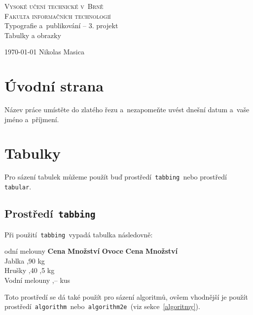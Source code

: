 \documentclass[a4paper, 11pt]{article}
\begin{document}
\begin{titlepage}
		\begin{center}
			{\Huge\textsc{Vysoké učení technické v~Brně}}\\
			\huge\textsc{Fakulta informačních technologií} \\
			{\LARGE Typografie a~publikování -- 3. projekt}\\
			\Huge{Tabulky a obrazky
			}
		\end{center}

		{\Large
			\today
			\hfill
			Nikolas Masica
		}
	\end{titlepage}


\section{Úvodní strana}
Název práce umístěte do zlatého řezu a~nezapomeňte uvést dnešní datum a~vaše jméno a~příjmení.
\section{Tabulky}
Pro sázení tabulek můžeme použít buď prostředí\texttt{ tabbing }nebo prostředí\texttt{ tabular}.
\subsection{Prostředí\texttt{ tabbing}}
Při použití\texttt{ tabbing }vypadá tabulka následovně:
\begin{tabbing}
odní melouny    \quad	\= \textbf{Cena} \quad	\= \textbf{Množství}	\kill
\textbf{Ovoce}		\> \textbf{Cena}		\> \textbf{Množství}	\\
Jablka				,90				 kg					\\
Hrušky				,40				,5 kg				\\
Vodní melouny		,--				 kus				\\
\end{tabbing}
Toto prostředí se dá také použít pro sázení algoritmů, ovšem vhodnější je použít
prostředí\texttt{ algorithm }nebo\texttt{ algorithm2e }(viz sekce~\ref{algoritmy}).
\end{document}
